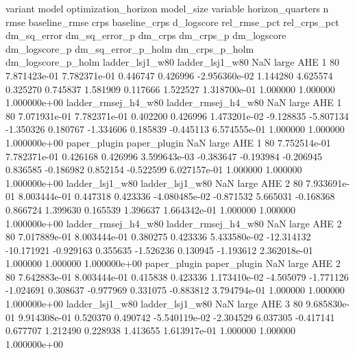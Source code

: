             variant               model  optimization_horizon model_size variable  horizon_quarters  n         rmse  baseline_rmse          crps  baseline_crps    d_logscore  rel_rmse_pct  rel_crps_pct  dm_sq_error  dm_sq_error_p   dm_crps  dm_crps_p  dm_logscore  dm_logscore_p  dm_sq_error_p_holm  dm_crps_p_holm  dm_logscore_p_holm
    ladder_lsj1_w80     ladder_lsj1_w80                   NaN      large      AHE                 1 80 7.871423e-01   7.782371e-01      0.446747       0.426996 -2.956360e-02      1.144280      4.625574     0.325270       0.745837  1.581909   0.117666     1.522527   1.318700e-01            1.000000        1.000000        1.000000e+00
ladder_rmsej_h4_w80 ladder_rmsej_h4_w80                   NaN      large      AHE                 1 80 7.071931e-01   7.782371e-01      0.402200       0.426996  1.473201e-02     -9.128835     -5.807134    -1.350326       0.180767 -1.334606   0.185839    -0.445113   6.574555e-01            1.000000        1.000000        1.000000e+00
       paper_plugin        paper_plugin                   NaN      large      AHE                 1 80 7.752514e-01   7.782371e-01      0.426168       0.426996  3.599643e-03     -0.383647     -0.193984    -0.206945       0.836585 -0.186982   0.852154    -0.522599   6.027157e-01            1.000000        1.000000        1.000000e+00
    ladder_lsj1_w80     ladder_lsj1_w80                   NaN      large      AHE                 2 80 7.933691e-01   8.003444e-01      0.447318       0.423336 -4.080485e-02     -0.871532      5.665031    -0.168368       0.866724  1.399630   0.165539     1.396637   1.664342e-01            1.000000        1.000000        1.000000e+00
ladder_rmsej_h4_w80 ladder_rmsej_h4_w80                   NaN      large      AHE                 2 80 7.017889e-01   8.003444e-01      0.380275       0.423336  5.433580e-02    -12.314132    -10.171921    -0.929163       0.355635 -1.526236   0.130945    -1.193612   2.362018e-01            1.000000        1.000000        1.000000e+00
       paper_plugin        paper_plugin                   NaN      large      AHE                 2 80 7.642883e-01   8.003444e-01      0.415838       0.423336  1.173410e-02     -4.505079     -1.771126    -1.024691       0.308637 -0.977969   0.331075    -0.883812   3.794794e-01            1.000000        1.000000        1.000000e+00
    ladder_lsj1_w80     ladder_lsj1_w80                   NaN      large      AHE                 3 80 9.685830e-01   9.914308e-01      0.520370       0.490742 -5.540119e-02     -2.304529      6.037305    -0.417141       0.677707  1.212490   0.228938     1.413655   1.613917e-01            1.000000        1.000000        1.000000e+00
